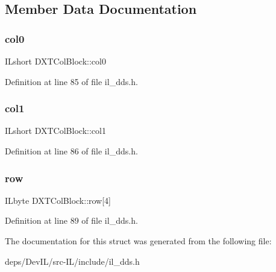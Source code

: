 \subsection{Member Data Documentation}
\mbox{\label{structDXTColBlock_a2d6b1a92c99e88be4f063e8425421430}} 
\subsubsection{\texorpdfstring{col0}{col0}}
{\footnotesize\ttfamily I\+Lshort D\+X\+T\+Col\+Block\+::col0}



Definition at line 85 of file il\+\_\+dds.\+h.

\mbox{\label{structDXTColBlock_abdc9407f07f1f56a47d26ad3e6fc68ef}} 
\subsubsection{\texorpdfstring{col1}{col1}}
{\footnotesize\ttfamily I\+Lshort D\+X\+T\+Col\+Block\+::col1}



Definition at line 86 of file il\+\_\+dds.\+h.

\mbox{\label{structDXTColBlock_acd271b69f417cbecfc4c5b2f93876a51}} 
\subsubsection{\texorpdfstring{row}{row}}
{\footnotesize\ttfamily I\+Lbyte D\+X\+T\+Col\+Block\+::row\mbox{[}4\mbox{]}}



Definition at line 89 of file il\+\_\+dds.\+h.



The documentation for this struct was generated from the following file\+:\begin{DoxyCompactItemize}
\item 
deps/\+Dev\+I\+L/src-\/\+I\+L/include/il\+\_\+dds.\+h\end{DoxyCompactItemize}
